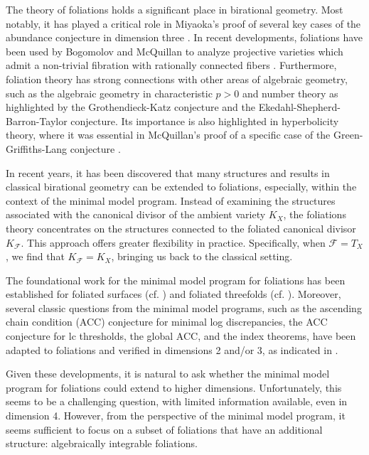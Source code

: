 \documentclass[11pt]{amsart}
\numberwithin{equation}{section}
\newcommand{\Ff}{\mathcal{F}}
\theoremstyle{definition}
\theoremstyle{definition}
\theoremstyle{definition}
\begin{document}
The theory of foliations holds a significant place in birational geometry. Most notably, it has played a critical role in Miyaoka's proof of several key cases of the abundance conjecture in dimension three \cite{Miy87}. In recent developments, foliations have been used by Bogomolov and McQuillan to analyze projective varieties which admit a non-trivial fibration with rationally connected fibers \cite{BM16}. Furthermore, foliation theory has strong connections with other areas of algebraic geometry, such as the algebraic geometry in characteristic $p>0$ and number theory as highlighted by the Grothendieck-Katz conjecture and the Ekedahl-Shepherd-Barron-Taylor conjecture. Its importance is also highlighted in hyperbolicity theory, where it was essential in McQuillan's proof of a specific case of the Green-Griffiths-Lang conjecture \cite{McQ98}.

In recent years, it has been discovered that many structures and results in classical birational geometry can be extended to foliations, especially, within the context of the minimal model program. Instead of examining the structures associated with the canonical divisor of the ambient variety $K_X$, the foliations theory concentrates on the structures connected to the foliated canonical divisor $K_{\Ff}$. This approach offers greater flexibility in practice. Specifically, when $\Ff = T_X$, we find that $K_{\Ff}=K_X$, bringing us back to the classical setting.

The foundational work for the minimal model program for foliations has been established for foliated surfaces (cf. \cite{McQ08,Bru15}) and foliated threefolds (cf. \cite{CS20,Spi20,CS21,SS22}). Moreover, several classic questions from the minimal model programs, such as the ascending chain condition (ACC) conjecture for minimal log discrepancies, the ACC conjecture for lc thresholds, the global ACC, and the index theorems, have been adapted to foliations and verified in dimensions 2 and/or 3, as indicated in \cite{Che22,Che23,LLM23,LMX23a,LMX23b}.

Given these developments, it is natural to ask whether the minimal model program for foliations could extend to higher dimensions. Unfortunately, this seems to be a challenging question, with limited information available, even in dimension 4. However, from the perspective of the minimal model program, it seems sufficient to focus on a subset of foliations that have an additional structure: algebraically integrable foliations.
\end{document}
